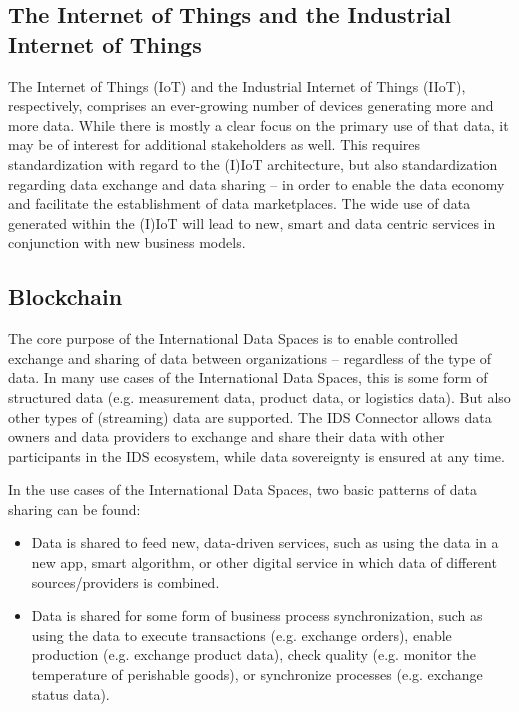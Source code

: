\subsection{The Internet of Things and the Industrial Internet of Things}\label{subsec:iiot}
The Internet of Things (IoT) and the Industrial Internet of Things (IIoT), respectively, comprises an ever-growing number of devices generating more and more data. While there is mostly a clear focus on the primary use of that data, it may be of interest for additional stakeholders as well. This requires standardization with regard to the (I)IoT architecture, but also standardization regarding data exchange and data sharing – in order to enable the data economy and facilitate the establishment of data marketplaces. The wide use of data generated within the (I)IoT will lead to new, smart and data centric services in conjunction with new business models.

\subsection{Blockchain}\label{subsec:blockchain}
The core purpose of the International Data Spaces is to enable controlled exchange and sharing of data between organizations – regardless of the type of data. In many use cases of the International Data Spaces, this is some form of structured data (e.g. measurement data, product data, or logistics data). But also other types of (streaming) data are supported. The IDS Connector allows data owners and data providers to exchange and share their data with other participants in the IDS ecosystem, while data sovereignty is ensured at any time. 

In the use cases of the International Data Spaces, two basic patterns of data sharing can be found: 

\begin{itemize}
	\item Data is shared to feed new, data-driven services, such as using the data in a new app, smart algorithm, or other digital service in which data of different sources/providers is combined. 

	\item Data is shared for some form of business process synchronization, such as using the data to execute transactions (e.g. exchange orders), enable production (e.g. exchange product data), check quality (e.g. monitor the temperature of perishable goods), or synchronize processes (e.g. exchange status data). 
\end{itemize}

